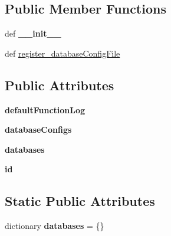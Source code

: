 \subsection*{Public Member Functions}
\begin{DoxyCompactItemize}
\item 
\hypertarget{classcheshire3_1_1server_1_1_simple_server_af5109426f7185c90fa7db3cad35c06f6}{def {\bfseries \-\_\-\-\_\-init\-\_\-\-\_\-}}\label{classcheshire3_1_1server_1_1_simple_server_af5109426f7185c90fa7db3cad35c06f6}

\item 
def \hyperlink{classcheshire3_1_1server_1_1_simple_server_a0011cea649857117dd40b017e675a811}{register\-\_\-database\-Config\-File}
\end{DoxyCompactItemize}
\subsection*{Public Attributes}
\begin{DoxyCompactItemize}
\item 
\hypertarget{classcheshire3_1_1server_1_1_simple_server_a5953415d90fa0098de9639039455f718}{{\bfseries default\-Function\-Log}}\label{classcheshire3_1_1server_1_1_simple_server_a5953415d90fa0098de9639039455f718}

\item 
\hypertarget{classcheshire3_1_1server_1_1_simple_server_add9a54b669c8394c5e38147f685e52a1}{{\bfseries database\-Configs}}\label{classcheshire3_1_1server_1_1_simple_server_add9a54b669c8394c5e38147f685e52a1}

\item 
\hypertarget{classcheshire3_1_1server_1_1_simple_server_a99f211abb336d37666142996ba7de1f9}{{\bfseries databases}}\label{classcheshire3_1_1server_1_1_simple_server_a99f211abb336d37666142996ba7de1f9}

\item 
\hypertarget{classcheshire3_1_1server_1_1_simple_server_a733622049fbfc87cc6e0ac5c9396ca4d}{{\bfseries id}}\label{classcheshire3_1_1server_1_1_simple_server_a733622049fbfc87cc6e0ac5c9396ca4d}

\end{DoxyCompactItemize}
\subsection*{Static Public Attributes}
\begin{DoxyCompactItemize}
\item 
\hypertarget{classcheshire3_1_1server_1_1_simple_server_a865c42ee735d7a7c74339b751959be65}{dictionary {\bfseries databases} = \{\}}\label{classcheshire3_1_1server_1_1_simple_server_a865c42ee735d7a7c74339b751959be65}

\end{DoxyCompactItemize}


